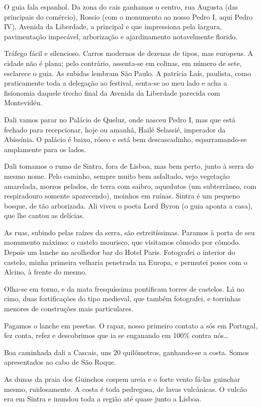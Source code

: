 O guia fala espanhol. Da zona do cais ganhamos o centro, rua Augusta (das principais do comércio), Rossio (com o monumento ao nosso Pedro I, aqui Pedro IV), Avenida da Liberdade, a principal e que impressiona pela largura, pavimentação impecável, arborização e ajardinamento notavelmente florido.

Tráfego fácil e silencioso. Carros modernos de dezenas de tipos, mas europeus. A cidade não é plana; pelo contrário, assenta-se em colinas, em número de sete, esclarece o guia. As subidas lembram São Paulo. A patrícia Laís, paulista, como praticamente toda a delegação ao festival, senta-se ao meu lado e acha a fisionomia daquele trecho final da Avenida da Liberdade parecida com Montevidéu.

Dali vamos parar no Palácio de Queluz, onde nasceu Pedro I, mas que está fechado para recepcionar, hoje ou amanhã, Hailé Selassié, imperador da Abissínia. O palácio é baixo, róseo e está bem descascadinho, esparramando-se amplamente para os lados.

Dali tomamos o rumo de Sintra, fora de Lisboa, mas bem perto, junto à serra do mesmo nome. Pelo caminho, sempre muito bem asfaltado, vejo vegetação amarelada, morros pelados, de terra com saibro, aquedutos (um subterrâneo, com respiradouro somente aparecendo), moinhos em ruínas. Sintra é um pequeno bosque, de tão arborizada. Ali viveu o poeta Lord Byron (o guia aponta a casa), que lhe cantou as delícias.

As ruas, subindo pelas raízes da serra, são estreitíssimas. Paramos à porta de seu monumento máximo: o castelo mourisco, que visitamos cômodo por cômodo. Depois um lanche no acolhedor bar do Hotel Paris. Fotografei o interior do castelo, minha primeira velharia penetrada na Europa, e permutei poses com o Alcino, à frente do mesmo.

Olha-se em torno, e da mata fresquíssima pontificam torres de castelos. Lá no cimo, duas fortificações do tipo medieval, que também fotografei, e torrinhas menores de construções mais particulares.

Pagamos o lanche em pesetas. O rapaz, nosso primeiro contato a sós em Portugal, fez conta, refez e descobrimos que ia se enganando em 100\% contra nós\ldots

Boa caminhada dali a Cascais, uns 20 quilômetros, ganhando-se a costa. Somos apresentados ao cabo de São Roque.

As dunas da praia dos Guinchos cospem areia e o forte vento fá-las guinchar mesmo, ruidosamente. A costa é toda pedregosa, de lavas vulcânicas. O vulcão era em Sintra e inundou toda a região até quase junto a Lisboa.

